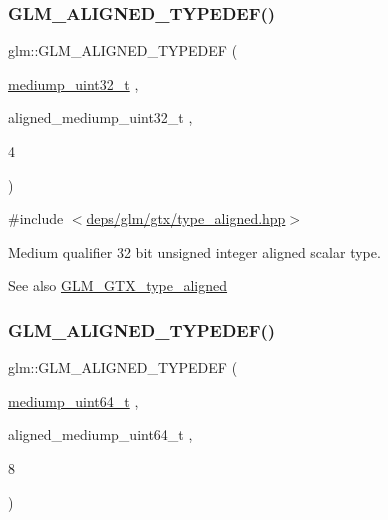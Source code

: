 \subsubsection{\texorpdfstring{G\+L\+M\+\_\+\+A\+L\+I\+G\+N\+E\+D\+\_\+\+T\+Y\+P\+E\+D\+E\+F()}{GLM\_ALIGNED\_TYPEDEF()}\hspace{0.1cm}{\footnotesize\ttfamily [87/209]}}
{\footnotesize\ttfamily glm\+::\+G\+L\+M\+\_\+\+A\+L\+I\+G\+N\+E\+D\+\_\+\+T\+Y\+P\+E\+D\+EF (\begin{DoxyParamCaption}\item[{\hyperlink{group__gtc__type__precision_gac7782c1e393f9ad47e41a177a685f287}{mediump\+\_\+uint32\+\_\+t}}]{,  }\item[{aligned\+\_\+mediump\+\_\+uint32\+\_\+t}]{,  }\item[{4}]{ }\end{DoxyParamCaption})}



{\ttfamily \#include $<$\hyperlink{gtx_2type__aligned_8hpp}{deps/glm/gtx/type\+\_\+aligned.\+hpp}$>$}

Medium qualifier 32 bit unsigned integer aligned scalar type. \begin{DoxySeeAlso}{See also}
\hyperlink{group__gtx__type__aligned}{G\+L\+M\+\_\+\+G\+T\+X\+\_\+type\+\_\+aligned} 
\end{DoxySeeAlso}
\mbox{\label{group__gtx__type__aligned_gad14a0f2ec93519682b73d70b8e401d81}} 
\subsubsection{\texorpdfstring{G\+L\+M\+\_\+\+A\+L\+I\+G\+N\+E\+D\+\_\+\+T\+Y\+P\+E\+D\+E\+F()}{GLM\_ALIGNED\_TYPEDEF()}\hspace{0.1cm}{\footnotesize\ttfamily [88/209]}}
{\footnotesize\ttfamily glm\+::\+G\+L\+M\+\_\+\+A\+L\+I\+G\+N\+E\+D\+\_\+\+T\+Y\+P\+E\+D\+EF (\begin{DoxyParamCaption}\item[{\hyperlink{group__gtc__type__precision_gaa97354d3120a6dc029a5e9563723de18}{mediump\+\_\+uint64\+\_\+t}}]{,  }\item[{aligned\+\_\+mediump\+\_\+uint64\+\_\+t}]{,  }\item[{8}]{ }\end{DoxyParamCaption})}



